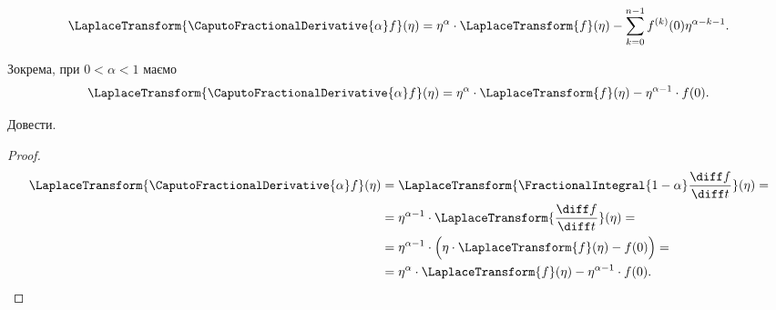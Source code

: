\begin{lemma}
    \begin{equation}
        \LaplaceTransform{\CaputoFractionalDerivative{\alpha} f}(\eta) = \eta^{\alpha} \cdot \LaplaceTransform{f}(\eta) - \sum_{k = 0}^{n - 1} f^{(k)}(0) \eta^{\alpha - k - 1}.
    \end{equation}
\end{lemma}
\begin{example}
    Зокрема, при $0 < \alpha < 1$ маємо
    \begin{equation}
        \LaplaceTransform{\CaputoFractionalDerivative{\alpha} f}(\eta) = \eta^{\alpha} \cdot \LaplaceTransform{f}(\eta) - \eta^{\alpha - 1} \cdot f(0).
    \end{equation}
\end{example}
\begin{exercise}
    Довести.
\end{exercise}
\begin{proof}
    \begin{equation}
        \begin{aligned}
            \LaplaceTransform{\CaputoFractionalDerivative{\alpha} f}(\eta) &= \LaplaceTransform{\FractionalIntegral{1 - \alpha} \frac{\diff f}{\diff t}}(\eta) = \\
            &= \eta^{\alpha - 1} \cdot \LaplaceTransform{\frac{\diff f}{\diff t}}(\eta) = \\
            &= \eta^{\alpha - 1} \cdot \Big(\eta \cdot \LaplaceTransform{f}(\eta) - f(0) \Big) = \\
            &= \eta^{\alpha} \cdot \LaplaceTransform{f}(\eta) - \eta^{\alpha - 1} \cdot f(0).
        \end{aligned}
    \end{equation}
\end{proof}